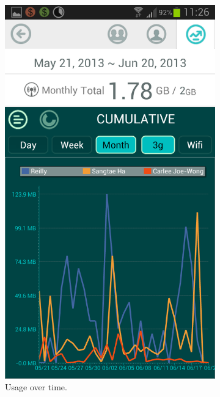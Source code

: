 \begin{figure}
\begin{subfigure}[b]{0.23\textwidth}
	\includegraphics[width = \textwidth]{Figures/Line_Graph.png}
	\caption{Usage over time.}
	\label{fig:datawiz_time}
	\end{subfigure}
	\begin{subfigure}[b]{0.23\textwidth}

\end{subfigure}
\end{figure}
